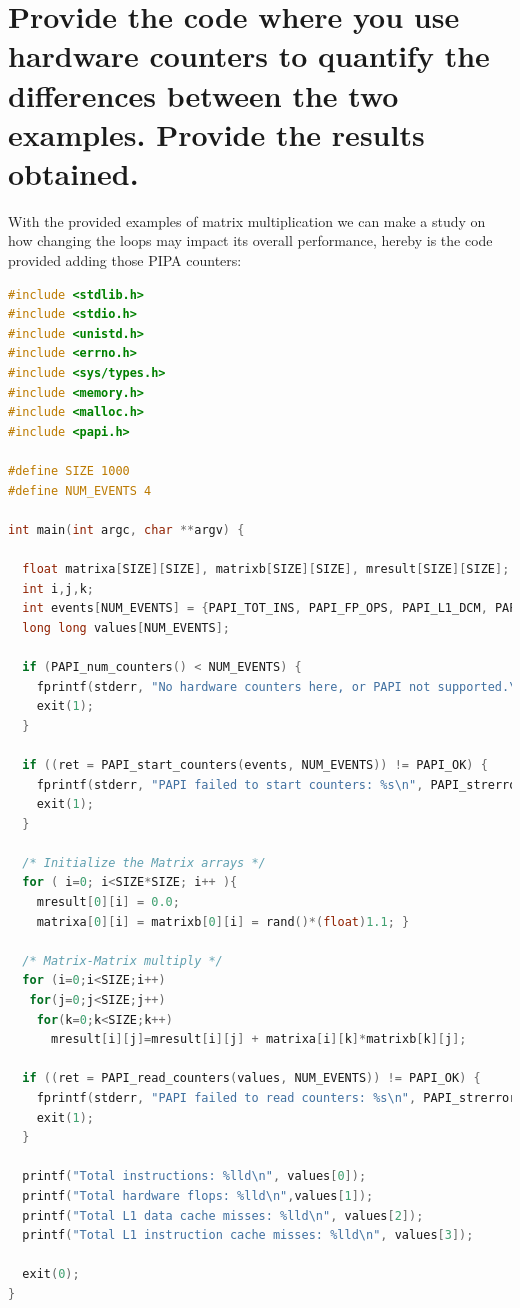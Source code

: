 \documentclass[11pt]{article}
\begin{document}
\hypertarget{6}{%
\section{Provide the code where you use hardware counters to quantify the differences
between the two examples. Provide the results obtained.}\label{6}}
With the provided examples of matrix multiplication we can make a study on how changing the loops may impact its overall performance, hereby is the code provided adding those PIPA counters:

\begin{lstlisting}[language=C, caption=papi1.c from counters.c]
#include <stdlib.h>
#include <stdio.h>
#include <unistd.h>
#include <errno.h>
#include <sys/types.h>
#include <memory.h>
#include <malloc.h>
#include <papi.h>

#define SIZE 1000
#define NUM_EVENTS 4

int main(int argc, char **argv) {

  float matrixa[SIZE][SIZE], matrixb[SIZE][SIZE], mresult[SIZE][SIZE];
  int i,j,k;
  int events[NUM_EVENTS] = {PAPI_TOT_INS, PAPI_FP_OPS, PAPI_L1_DCM, PAPI_L1_ICM }, ret;
  long long values[NUM_EVENTS];

  if (PAPI_num_counters() < NUM_EVENTS) {
  	fprintf(stderr, "No hardware counters here, or PAPI not supported.\n");
  	exit(1);
  }

  if ((ret = PAPI_start_counters(events, NUM_EVENTS)) != PAPI_OK) {
  	fprintf(stderr, "PAPI failed to start counters: %s\n", PAPI_strerror(ret));
  	exit(1);
  }

  /* Initialize the Matrix arrays */
  for ( i=0; i<SIZE*SIZE; i++ ){
    mresult[0][i] = 0.0;
    matrixa[0][i] = matrixb[0][i] = rand()*(float)1.1; }

  /* Matrix-Matrix multiply */
  for (i=0;i<SIZE;i++)
   for(j=0;j<SIZE;j++)
    for(k=0;k<SIZE;k++)
      mresult[i][j]=mresult[i][j] + matrixa[i][k]*matrixb[k][j];

  if ((ret = PAPI_read_counters(values, NUM_EVENTS)) != PAPI_OK) {
  	fprintf(stderr, "PAPI failed to read counters: %s\n", PAPI_strerror(ret));
  	exit(1);
  }

  printf("Total instructions: %lld\n", values[0]);
  printf("Total hardware flops: %lld\n",values[1]);
  printf("Total L1 data cache misses: %lld\n", values[2]);
  printf("Total L1 instruction cache misses: %lld\n", values[3]);

  exit(0);
}

\end{lstlisting}
\end{document}
